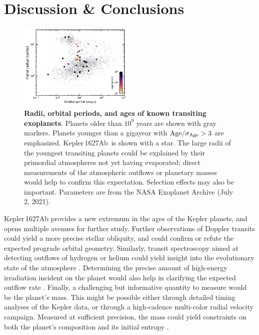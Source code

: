 \documentclass[12pt,modern,twocolumn,tighten]{aastex63}
\newcommand{\pn}{Kepler\,1627Ab} %
\begin{document}
\section{Discussion \& Conclusions}
\label{sec:conc}

\begin{figure}[tp]
	\begin{center}
		\leavevmode
		\includegraphics[width=0.49\textwidth]{f14.pdf}
	\end{center}
	\vspace{-0.7cm}
	\caption{
    {\bf Radii, orbital periods, and ages of known transiting
    exoplanets}.  Planets older than $10^9$ years are shown with gray
    markers.  Planets younger than a gigayear with ${\rm
    Age}/\sigma_{\rm Age} > 3$ are emphasized.  \pn\ is shown with a
    star.  The large radii of the youngest transiting planets could be
    explained by their primordial atmospheres not yet having
    evaporated; direct measurements of the atmospheric outflows or
    planetary masses would help to confirm this expectation.
    Selection effects may also be important.  Parameters are from the
    NASA Exoplanet Archive (July 2, 2021).
		\label{fig:rp_period_age}
	}
\end{figure}



Kepler\,1627Ab provides a new extremum in the ages of the Kepler
planets, and opens multiple avenues for further study.  Further
observations of Doppler transits could yield a more precise stellar
obliquity, and could confirm or refute the expected prograde orbital
geometry.  Similarly, transit spectroscopy aimed at detecting outflows
of hydrogen or helium could yield insight into the evolutionary state
of the atmosphere \citep[{\it
e.g.},][]{spake_helium_2018,vissapragada_2020}.  Determining the
precise amount of high-energy irradiation incident on the planet would
also help in clarifying the expected outflow rate \citep[{\it
e.g.},][]{poppenhaeger_2021}.  Finally, a challenging but informative
quantity to measure would be the planet's mass.  This might be
possible either through detailed timing analyses of the Kepler data,
or through a high-cadence multi-color radial velocity campaign.
Measured at sufficient precision, the mass could yield constraints on
both the planet's composition and its initial entropy
\citep{owen_constraining_2020}.
\end{document}

